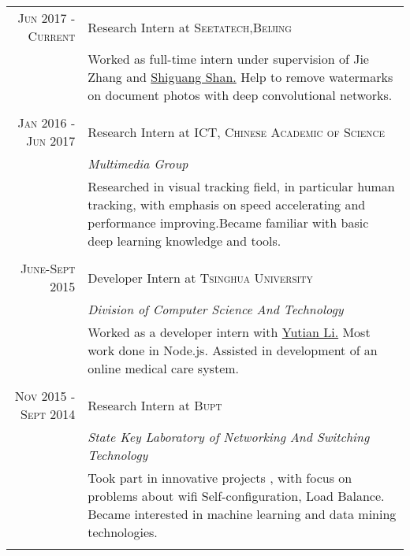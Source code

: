 \documentclass[a4paper,10pt]{article}
\begin{document}
\begin{tabular}{r|p{11cm}}

 \textsc{Jun 2017 - Current} & Research Intern at \textsc{Seetatech,Beijing} \\&\footnotesize{Worked as full-time intern under supervision of Jie Zhang and} \href{http://www.jdl.ac.cn/user/sgshan/index_en.htm}{Shiguang Shan.} \footnotesize{Help to remove watermarks on document photos with deep convolutional networks.}\\\multicolumn{2}{c}{} \\

 \textsc{Jan 2016 - Jun 2017} & Research Intern at \textsc{ICT, Chinese Academic of Science} \\&\emph{Multimedia Group}\\&\footnotesize{Researched in visual tracking field, in particular human tracking, with emphasis on speed accelerating and performance improving.Became familiar with basic deep learning knowledge and tools.}\\\multicolumn{2}{c}{} \\
 \textsc{June-Sept 2015} & Developer Intern at \textsc{Tsinghua University}  \\&\emph{Division of Computer Science And Technology}\\& \footnotesize{Worked as a developer intern with }\href{https://yutian.li/}{Yutian Li.} \footnotesize{Most work done in Node.js. Assisted in development of an online medical care system.}\\\multicolumn{2}{c}{} \\
 \textsc{Nov 2015 - Sept 2014} & Research Intern at \textsc{Bupt}  \\&\emph{State Key Laboratory of Networking And Switching Technology}\\&\footnotesize{Took part in innovative projects , with focus on problems about wifi Self-configuration, Load Balance. Became interested in machine learning and data mining technologies.}\\\multicolumn{2}{c}{} \\
\end{tabular}
\end{document}
